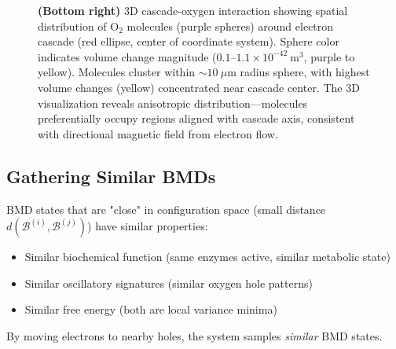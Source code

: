 \begin{figure}[htbp]
{    \textbf{(Bottom right)} 3D cascade-oxygen interaction showing spatial distribution of O$_2$ molecules (purple spheres) around electron cascade (red ellipse, center of coordinate system). Sphere color indicates volume change magnitude ($0.1$--$1.1 \times 10^{-42}~\text{m}^3$, purple to yellow). Molecules cluster within $\sim 10~\mu\text{m}$ radius sphere, with highest volume changes (yellow) concentrated near cascade center. The 3D visualization reveals anisotropic distribution---molecules preferentially occupy regions aligned with cascade axis, consistent with directional magnetic field from electron flow.
    }
    \label{fig:electron_transport_chain}
    \end{figure}

\subsection{Gathering Similar BMDs}

\begin{theorem}
\label{thm:local_similarity}
BMD states that are "close" in configuration space (small distance $d(\mathcal{B}^{(i)}, \mathcal{B}^{(j)})$) have similar properties:
\begin{itemize}
\item Similar biochemical function (same enzymes active, similar metabolic state)
\item Similar oscillatory signatures (similar oxygen hole patterns)
\item Similar free energy (both are local variance minima)
\end{itemize}

By moving electrons to nearby holes, the system samples \textit{similar} BMD states.
\end{theorem}

